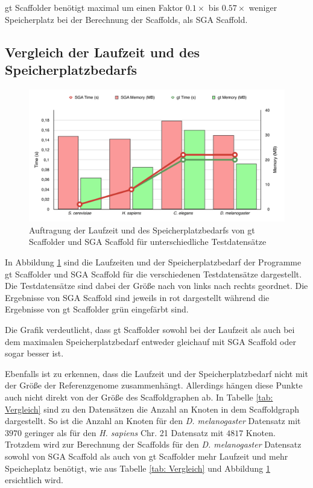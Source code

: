 \documentclass[a4paper,10pt,parskip]{scrartcl}
\begin{document}
gt Scaffolder benötigt maximal um einen Faktor $0.1\times$ bis
$0.57\times$ weniger Speicherplatz bei der Berechnung der Scaffolds,
als SGA Scaffold.

\subsection{Vergleich der Laufzeit und des Speicherplatzbedarfs}
\begin{figure}[t]
  \includegraphics[width=\textwidth,height=0.8\textheight,keepaspectratio]{presentation/figures/sga_vs_gt.pdf}
  \caption{\label{abb: Zeit}Auftragung der Laufzeit und des
    Speicherplatzbedarfs von gt Scaffolder und SGA Scaffold für
    unterschiedliche Testdatensätze}
\end{figure}

In Abbildung \ref{abb: Zeit} sind die Laufzeiten und der
Speicherplatzbedarf der Programme gt Scaffolder und SGA Scaffold für
die verschiedenen Testdatensätze dargestellt. Die Testdatensätze sind
dabei der Größe nach von links nach rechts geordnet. Die Ergebnisse
von SGA Scaffold sind jeweils in rot dargestellt während die
Ergebnisse von gt Scaffolder grün eingefärbt sind.

Die Grafik verdeutlicht, dass gt Scaffolder sowohl bei der Laufzeit
als auch bei dem maximalen Speicherplatzbedarf entweder gleichauf mit
SGA Scaffold oder sogar besser ist.

Ebenfalls ist zu erkennen, dass die Laufzeit und der
Speicherplatzbedarf nicht mit der Größe der Referenzgenome
zusammenhängt. Allerdings hängen diese Punkte  auch nicht direkt von der Größe des Scaffoldgraphen
ab. In Tabelle \ref{tab: Vergleich} sind zu den Datensätzen die Anzahl
an Knoten in dem Scaffoldgraph dargestellt. So ist die Anzahl an
Knoten für den \textit{D. melanogaster} Datensatz mit $3970$ geringer
als für den \textit{H. sapiens} Chr. 21 Datensatz mit $4817$
Knoten. Trotzdem wird zur Berechnung der Scaffolds für den
\textit{D. melanogaster} Datensatz sowohl von SGA Scaffold als auch
von gt Scaffolder mehr Laufzeit und mehr Speicheplatz benötigt, wie
aus Tabelle \ref{tab: Vergleich} und Abbildung \ref{abb: Zeit}
ersichtlich wird. 
\end{document}
